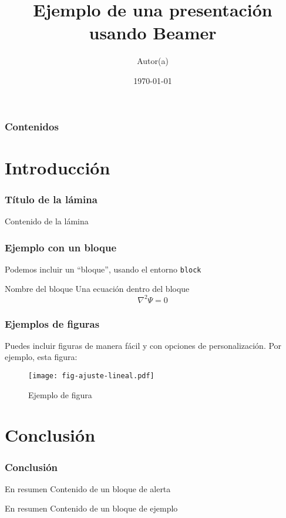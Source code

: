 \documentclass[colorlinks,aspectratio=169]{beamer}
\begin{document}
\title{Ejemplo de una presentación usando Beamer}
\author[iniciales de autor(a)]{Autor(a)} 
\date{\today}
\frame{\titlepage}

\begin{frame}
\frametitle{Contenidos}
\tableofcontents
\end{frame}


\section{Introducción}
\begin{frame}\frametitle{Título de la lámina}
Contenido de la lámina
\end{frame}

\begin{frame}\frametitle{Ejemplo con un bloque}
Podemos incluir un ``bloque'', usando el entorno \texttt{block}
\begin{block}{Nombre del bloque}
Una ecuación dentro del bloque
\begin{equation}
\nabla^2\Psi=0
\end{equation}
\end{block}
\end{frame}

\begin{frame}
\frametitle{Ejemplos de figuras}
Puedes incluir figuras de manera fácil y con opciones de personalización. Por ejemplo, esta figura:
\begin{figure}[ht]
\centering
\texttt{[image: fig-ajuste-lineal.pdf]}
\caption{Ejemplo de figura}
\label{fig:ejemplo}
\end{figure}
\end{frame}

\section{Conclusión}

\begin{frame}
\frametitle{Conclusión}
\begin{alertblock}{En resumen}
Contenido de un bloque de alerta
\end{alertblock}

\begin{exampleblock}{En resumen}
Contenido de un bloque de ejemplo
\end{exampleblock}
\end{frame}
\end{document}
